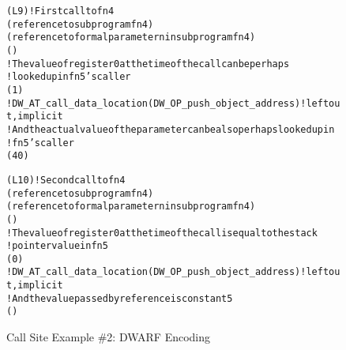 \begin{figure}[h]
\begin{dwflisting}
\begin{alltt}

\DWTAGcallsite
    \DWATcallreturnpc(L9) ! First call to fn4
    \DWATcallorigin(reference to subprogram fn4)
    \DWTAGcallsiteparameter
        \DWATcallparameter(reference to formal parameter n in subprogram fn4)
        \DWATlocation(\DWOPregzero)
        ! The value of register 0 at the time of the call can be perhaps 
        !   looked up in fn5's caller
        \DWATcallvalue(\DWOPentryvalue{} 1 \DWOPregzero)
        ! DW_AT_call_data_location(DW_OP_push_object_address) ! left out, implicit
        ! And the actual value of the parameter can be also perhaps looked up in
        ! fn5's caller
        \DWATcalldatavalue(\DWOPentryvalue{} 4 \DWOPbregzero{} 0 )
        
\DWTAGcallsite
    \DWATcallreturnpc(L10) ! Second call to fn4
    \DWATcallorigin(reference to subprogram fn4)
    \DWTAGcallsiteparameter
        \DWATcallparameter(reference to formal parameter n in subprogram fn4)
        \DWATlocation(\DWOPregzero)
        ! The value of register 0 at the time of the call is equal to the stack
        ! pointer value in fn5
        \DWATcallvalue(\DWOPbregthree{} 0)
        ! DW_AT_call_data_location(DW_OP_push_object_address) ! left out, implicit
        ! And the value passed by reference is constant 5
        \DWATcalldatavalue(\DWOPlitfive)
        
\end{alltt}
\end{dwflisting}
\caption{Call Site Example \#2: DWARF Encoding}
\label{fig:callsiteexample2dwarf}
\end{figure}
